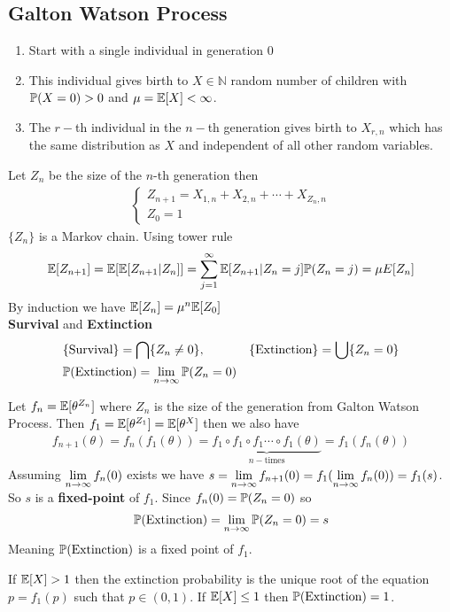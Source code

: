 \documentclass[12pt,a4paper]{article}
\begin{document}
\subsection{Galton Watson Process }
\begin{enumerate}[(1)]
    \item Start with a single individual in generation 0
    \item This individual gives birth to $X\in \mathbb{N}$ random number of children with $\P(X = 0) > 0$ and $\mu = \E[X] < \infty$. 
    \item The $r-$th individual in the $n-$th generation gives birth to $X_{r,n}$ which has the same distribution as $X$ and independent of all other random variables.   
\end{enumerate}
Let $Z_n$ be the size of the $n$-th generation then 
\begin{align*}
    \begin{cases}
        Z_{n+1} = X_{1,n} + X_{2,n} + \cdots + X_{Z_n, n}\\
        Z_{0} = 1
    \end{cases}
\end{align*}
$\{Z_n\}$ is a Markov chain. Using tower rule 
\begin{align*}
    \E[Z_{n+1}] = \E[\E[Z_{n+1} | Z_{n}]] = \nsum{j=1}{\infty}\E[Z_{n+1} | Z_n = j]\P(Z_n = j) = \mu E[Z_{n}]
\end{align*} 
By induction we have $\E[Z_n] = \mu^n \E[Z_0]$ \\
\textbf{Survival} and \textbf{Extinction}
\begin{align*}
    &\{\text{Survival}\} = \bigcap \{Z_n \neq  0\}, & \{\text{Extinction}\} = \bigcup \{Z_n = 0\}\\ 
    &\P(\text{Extinction}) = \nlim{n}{\infty}\P(Z_n = 0)
\end{align*}
\begin{example}
    Let $f_n = \E[\theta^{Z_n}]$ where $Z_n$ is the size of the generation from Galton Watson Process. Then $f_1 = \E[\theta^{Z_1}] = \E[\theta^{X}]$ then we also have 
    \begin{align*}
        f_{n+1}(\theta) = f_n(f_1(\theta)) = \underbrace{f_1\circ f_1 \circ f_1 \cdots \circ f_1(\theta)}_{\text{$n-$times}} = f_1(f_n(\theta))
    \end{align*}
    Assuming $\nlim{n}{\infty}f_n(0)$ exists we have $s = \nlim{n}{\infty}f_{n+1}(0) = f_1(\nlim{n}{\infty}f_n(0)) = f_1(s)$. So $s$ is a \textbf{fixed-point} of $f_1$. Since $f_n(0) = \P(Z_n = 0)$ so 
    \begin{align*}
        \P(\text{Extinction}) = \nlim{n}{\infty}\P(Z_n = 0) = s
    \end{align*}
    Meaning $\P(\text{Extinction})$ is a fixed point of $f_1$. 
\end{example}
\begin{thm}
    If $\E[X] > 1$ then the extinction probability is the unique root of the equation $p = f_1(p)$ such that $p\in (0,1)$. If $\E[X] \leq 1$ then $\P(\text{Extinction}) = 1$. 
\end{thm}
\newpage
\end{document}
